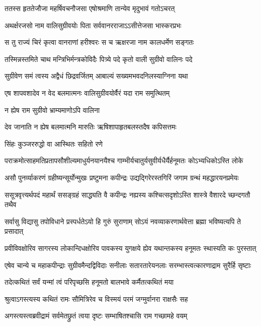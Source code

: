 \twolineshloka
{ततस्स हृततेजौजा महर्षिवचनौजसा}
{एषोश्रमाणि तान्येव मृदुभावं गतोऽचरत्} %

\twolineshloka
{अथर्क्षरजसो नाम वालिसुग्रीवयोः पिता}
{सर्ववानरराजाऽऽसीत्तेजसा भास्करप्रभः} %

\twolineshloka
{स तु राज्यं चिरं कृत्वा वानराणां हरीश्वरः}
{स च ऋक्षरजा नाम कालधर्मेण सङ्गतः} %

\twolineshloka
{तस्मिन्नस्तमिते चाथ मन्त्रिभिर्मन्त्रकोविदैः}
{पित्र्ये पदे कृतो वाली सुग्रीवो वालिनः पदे} %

\twolineshloka
{सुग्रीवेण समं त्वस्य अद्वैधं छिद्रवर्जितम्}
{आबाल्यं सख्यमभवदनिलस्याग्निना यथा} %

\twolineshloka
{एष शापवशादेव न वेद बलमात्मनः}
{वालिसुग्रीवयोर्वैरं यदा राम समुत्थितम्} %

\onelineshloka
{न ह्येष राम सुग्रीवो भ्राम्यमाणोऽपि वालिना} %

\twolineshloka
{देव जानाति न ह्येष बलमात्मनि मारुतिः}
{ऋषिशापाहृतबलस्तदैष कपिसत्तमः} %

\onelineshloka
{सिंहः कुञ्जररुद्धो वा आस्थितः सहितो रणे} %

\twolineshloka
{पराक्रमोत्साहमतिप्रतापसौशील्यमाधुर्यनयानयैश्च}
{गाम्भीर्यचातुर्यसुवीर्यधैर्यैर्हनूमतः कोऽभ्यधिकोऽस्ति लोके} %

\twolineshloka
{असौ पुनर्व्याकरणं ग्रहीष्यन्सूर्योन्मुखः प्रष्टुमना कपीन्द्रः}
{उद्यद्गिरेरस्तगिरिं जगाम ग्रन्थं महद्धारयनप्रमेयः} %

\twolineshloka
{ससूत्रवृत्त्यर्थपदं महार्थं ससङ्ग्रहं साद्ध्यति वै कपीन्द्रः}
{नह्यस्य कश्चित्सदृशोऽस्ति शास्त्रे वैशारदे च्छन्दगतौ तथैव} %

\twolineshloka
{सर्वासु विद्यासु तपोविधाने प्रस्पर्धतेऽयो हि गुरुं सुराणाम्}
{सोऽयं नवव्याकरणार्थवेत्ता ब्रह्मा भविष्यत्यपि ते प्रसादात्} %

\onelineshloka
{प्रवीविवक्षोरिव सागरस्य लोकान्दिधक्षोरिव पावकस्य युगक्षये ह्येव यथान्तकस्य हनूमतः स्थास्यति कः पुरस्तात्} %

\twolineshloka
{एषेव चान्ये च महाकपीन्द्राः सुग्रीवमैन्दद्विविदाः सनीलाः}
{सतारतारेयनलाः सरम्भास्त्वत्कारणाद्राम सुरैर्हि सृष्टाः} %

\twolineshloka
{तदेत्कथितं सर्वं यन्मां त्वं परिपृच्छसि}
{हनूमतो बालभावे कर्मैतत्कथितं मया} %

\twolineshloka
{श्रुत्वाऽगस्त्यस्य कथितं रामः सौमित्रिरेव च}
{विस्मयं परमं जग्मुर्वानरा राक्षसैः सह} %

\twolineshloka
{अगस्त्यस्त्वब्रवीद्रामं सर्वमेतछ्रुतं त्वया}
{दृष्टः सम्भाषितश्चासि राम गच्छामहे वयम्} %

